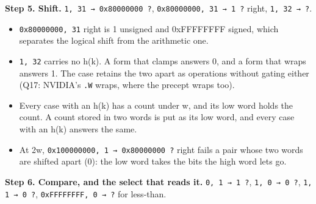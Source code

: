 \textbf{Step 5. Shift.} \texttt{1, 31 → 0x80000000 ?}, \texttt{0x80000000, 31 → 1 ?} right, \texttt{1, 32 → ?}.

\begin{itemize}
\item \texttt{0x80000000, 31} right is 1 unsigned and 0xFFFFFFFF signed, which separates the logical shift from the arithmetic one.
\item \texttt{1, 32} carries no h(k). A form that clamps answers 0, and a form that wraps answers 1. The case retains the two apart as operations without gating either (Q17: NVIDIA's \texttt{.\allowbreak{}W} wraps, where the precept wraps too).
\item Every case with an h(k) has a count under w, and its low word holds the count. A count stored in two words is put as its low word, and every case with an h(k) answers the same.
\item At 2w, \texttt{0x100000000, 1 → 0x80000000 ?} right fails a pair whose two words are shifted apart (0): the low word takes the bits the high word lets go.
\end{itemize}

\textbf{Step 6. Compare, and the select that reads it.} \texttt{0, 1 → 1 ?}, \texttt{1, 0 → 0 ?}, \texttt{1, 1 → 0 ?}, \texttt{0x\allowbreak{}FFFFFFFF, 0 → ?} for less-than.

